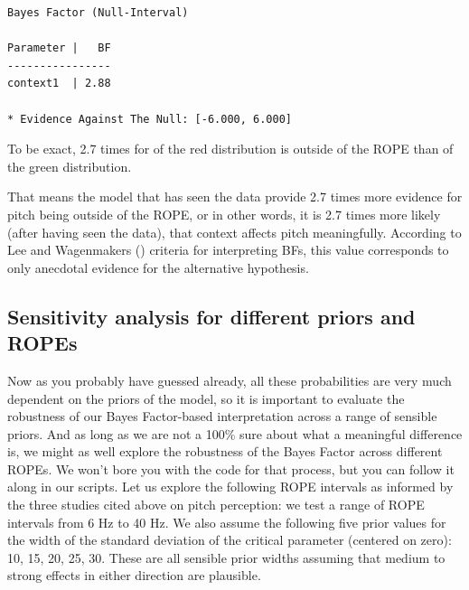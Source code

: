 \documentclass[
  doc,
  floatsintext,
  longtable,
  nolmodern,
  notxfonts,
  notimes,
  colorlinks=true,linkcolor=blue,citecolor=blue,urlcolor=blue]{apa7}
\begin{document}
\begin{verbatim}
Bayes Factor (Null-Interval)

Parameter |   BF
----------------
context1  | 2.88

* Evidence Against The Null: [-6.000, 6.000]
\end{verbatim}

To be exact, 2.7 times for of the red distribution is outside of the
ROPE than of the green distribution.

That means the model that has seen the data provide 2.7 times more
evidence for pitch being outside of the ROPE, or in other words, it is
2.7 times more likely (after having seen the data), that context affects
pitch meaningfully. According to Lee and Wagenmakers
() criteria for
interpreting BFs, this value corresponds to only anecdotal evidence for
the alternative hypothesis.

\subsection{Sensitivity analysis for different priors and
ROPEs}\label{sensitivity-analysis-for-different-priors-and-ropes}

Now as you probably have guessed already, all these probabilities are
very much dependent on the priors of the model, so it is important to
evaluate the robustness of our Bayes Factor-based interpretation across
a range of sensible priors. And as long as we are not a 100\% sure about
what a meaningful difference is, we might as well explore the robustness
of the Bayes Factor across different ROPEs. We won't bore you with the
code for that process, but you can follow it along in our scripts. Let
us explore the following ROPE intervals as informed by the three studies
cited above on pitch perception: we test a range of ROPE intervals from
6 Hz to 40 Hz. We also assume the following five prior values for the
width of the standard deviation of the critical parameter (centered on
zero): 10, 15, 20, 25, 30. These are all sensible prior widths assuming
that medium to strong effects in either direction are plausible.
\end{document}
